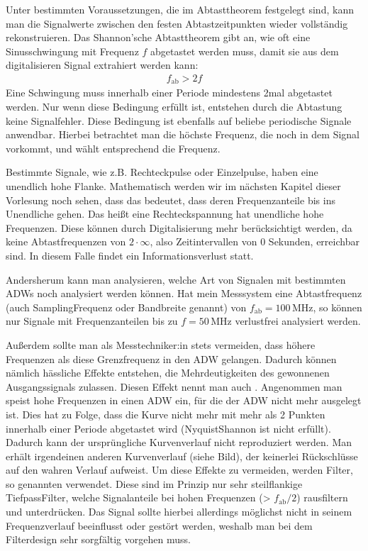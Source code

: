 \documentclass[letterpaper,10pt,english]{jupyterBook}
\begin{document}
\sphinxAtStartPar
Unter bestimmten Voraussetzungen, die im Abtasttheorem festgelegt sind, kann man die Signalwerte zwischen den festen Abtastzeitpunkten wieder vollständig rekonstruieren. Das Shannon’sche Abtasttheorem gibt an, wie oft eine Sinusschwingung mit Frequenz \(f\) abgetastet werden muss, damit sie aus dem digitalisieren Signal extrahiert werden kann:
\begin{equation*}
\begin{split}f_\mathrm{ab} > 2f\end{split}
\end{equation*}
\sphinxAtStartPar
Eine Schwingung muss innerhalb einer Periode mindestens 2\sphinxhyphen{}mal abgetastet werden.
Nur wenn diese Bedingung erfüllt ist, entstehen durch die Abtastung keine Signalfehler.
Diese Bedingung ist ebenfalls auf beliebe periodische Signale anwendbar. Hierbei betrachtet man die höchste Frequenz, die noch in dem Signal vorkommt, und wählt entsprechend die \sphinxhyphen{}Frequenz.

\sphinxAtStartPar
Bestimmte Signale, wie z.B. Rechteckpulse oder Einzelpulse, haben eine unendlich hohe Flanke. Mathematisch werden wir im nächsten Kapitel dieser Vorlesung noch sehen, dass das bedeutet, dass deren Frequenzanteile bis ins Unendliche gehen. Das heißt eine Rechteckspannung hat unendliche hohe Frequenzen. Diese können durch Digitalisierung  mehr berücksichtigt werden, da keine Abtastfrequenzen von \(2\cdot \infty\), also Zeitintervallen von 0 Sekunden, erreichbar sind. In diesem Falle findet ein Informationsverlust statt.

\sphinxAtStartPar
Andersherum kann man analysieren, welche Art von Signalen mit bestimmten ADWs noch analysiert werden können. Hat mein Messsystem eine Abtastfrequenz (auch Sampling\sphinxhyphen{}Frequenz oder Bandbreite genannt) von \(f_\mathrm{ab} = 100\,\mathrm{MHz}\), so können nur Signale mit Frequenzanteilen bis zu \(f = 50\,\mathrm{MHz}\) verlustfrei analysiert werden.

\sphinxAtStartPar
Außerdem sollte man als Messtechniker:in stets vermeiden, dass höhere Frequenzen als diese Grenzfrequenz in den ADW gelangen.
Dadurch können nämlich hässliche Effekte entstehen, die Mehrdeutigkeiten des gewonnenen Ausgangssignals zulassen. Diesen Effekt nennt man auch . Angenommen man speist hohe Frequenzen in einen ADW ein, für die der ADW nicht mehr ausgelegt ist. Dies hat zu Folge, dass die Kurve nicht mehr mit mehr als 2 Punkten innerhalb einer Periode abgetastet wird (Nyquist\sphinxhyphen{}Shannon ist nicht erfüllt). Dadurch kann der ursprüngliche Kurvenverlauf nicht reproduziert werden. Man erhält irgendeinen anderen Kurvenverlauf (siehe Bild), der keinerlei Rückschlüsse auf den wahren Verlauf aufweist.
Um diese Effekte zu vermeiden, werden Filter, so genannten  verwendet. Diese sind im Prinzip nur sehr steilflankige Tiefpass\sphinxhyphen{}Filter, welche Signalanteile bei hohen Frequenzen (> \(f_\mathrm{ab}/2\)) rausfiltern und unterdrücken.
Das Signal sollte hierbei allerdings möglichst nicht in seinem Frequenzverlauf beeinflusst oder gestört werden, weshalb man bei dem Filterdesign sehr sorgfältig vorgehen muss.
\end{document}
